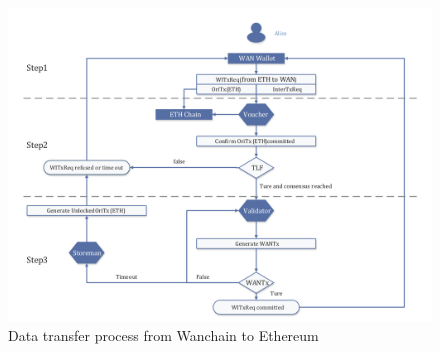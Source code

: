         \begin{figure}[H]
        \includegraphics[width=1\textwidth]{./figures/wantoeth.png}
        \centering
        \caption{{Data transfer process from Wanchain to Ethereum}\protect\footnotemark}
        \centering
        \label{fig:wan2}
        
        \end{figure}

